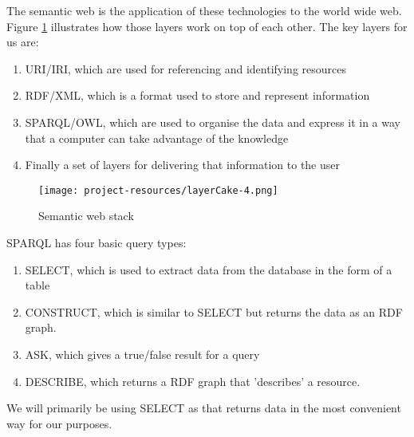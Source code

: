 \documentclass[a4paper]{article}
\begin{document}
The semantic web is the application of these technologies to the world wide web. Figure \ref{fig:semanticcake} illustrates how those layers work on top of each other. The key layers for us are: 
\begin{enumerate}
\item URI/IRI, which are used for referencing and identifying resources
\item RDF/XML, which is a format used to store and represent information
\item SPARQL/OWL, which are used to organise the data and express it in a way that a computer can take advantage of the knowledge
\item Finally a set of layers for delivering that information to the user
\end{enumerate}
\begin{figure}[H]
	\centering
	\texttt{[image: project-resources/layerCake-4.png]}
	\caption{Semantic web stack\autocite{SemanticStack}}
	\label{fig:semanticcake}
\end{figure}

SPARQL has four basic query types: 
\begin{enumerate}
\item SELECT, which is used to extract data from the database in the form of a table
\item CONSTRUCT, which is similar to SELECT but returns the data as an RDF graph.
\item ASK, which gives a true/false result for a query
\item DESCRIBE, which returns a RDF graph that 'describes' a resource.
\end{enumerate}

We will primarily be using SELECT as that returns data in the most convenient way for our purposes.


\iffalse
We can avoid having to type the entire URI/IRI by defining a prefix at the start such as \verb|<rdf:RDF xmlns:cervo="http://www.cervo.io/ontology#">|.


Storing data in this way allows us to take advantage of shared vocabulary and query other graph databases.

1 Demonstrate an in-depth knowledge of semantic data technologies.
2 Understand and critically appraise the uses of RDF and ontologies for big data, internet and knowledge based applications.
3 Understand the theoretical underpinnings and their application in semantic based reasoning.
\fi
\end{document}

